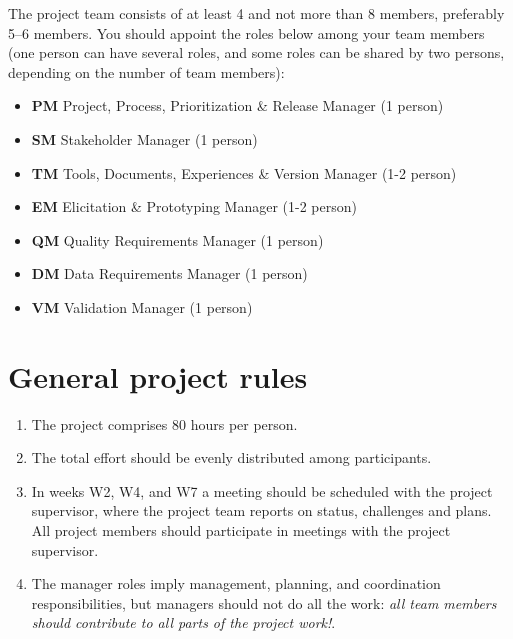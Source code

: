 \documentclass{project}
\begin{document}
The project team consists of at least 4 and not more than 8 members, preferably 5--6 members. You should appoint the roles below among your team members (one person can have several roles, and some roles can be shared by two persons, depending on the number of team members):

\begin{itemize}[noitemsep]
\item \textbf{PM} Project, Process, Prioritization \& Release Manager (1 person)
\item \textbf{SM} Stakeholder Manager (1 person)
\item \textbf{TM} Tools, Documents, Experiences \& Version Manager (1-2 person)
\item \textbf{EM} Elicitation \& Prototyping Manager (1-2 person)
\item \textbf{QM} Quality Requirements Manager (1 person)
\item \textbf{DM} Data Requirements Manager (1 person)
\item \textbf{VM} Validation Manager (1 person)
\end{itemize}

\section{General project rules}
\begin{enumerate}[nolistsep]
\item The project comprises 80 hours per person.
\item The total effort should be evenly distributed among participants.
\item In weeks W2, W4, and W7 a meeting should be scheduled with the project supervisor, where the project team reports on status, challenges and plans. All project members should participate in meetings with the project supervisor.
\item The manager roles imply management, planning, and coordination responsibilities, but managers should not do all the work: {\it all team members should contribute to all parts of the project work!}.
\end{enumerate}
\end{document}

